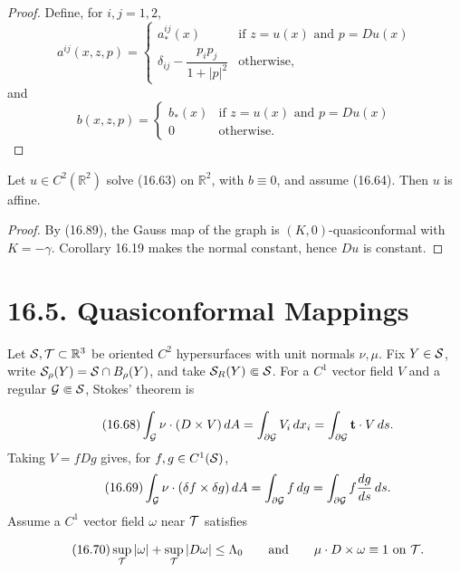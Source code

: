 \begin{proof}
Define, for $i,j=1,2$,
\[
a^{ij}(x,z,p)=\begin{cases}
 a_*^{ij}(x) & \text{if } z=u(x)\text{ and }p=Du(x)\\
 \delta_{ij}-\dfrac{p_ip_j}{1+|p|^2} & \text{otherwise,}
\end{cases}
\]
and
\[
b(x,z,p)=\begin{cases}
 b_*(x) & \text{if } z=u(x)\text{ and }p=Du(x)\\
 0 & \text{otherwise.}
\end{cases}
\]
\end{proof}

\begin{theorem}\label{gilbarg-trudinger.thm.16.12.bernstein}
Let $u\in C^2(\mathbb R^2)$ solve (16.63) on $\mathbb R^2$, with $b\equiv0$, and assume (16.64). Then $u$ is affine.
\end{theorem}
\begin{proof}
\sketch By (16.89), the Gauss map of the graph is $(K,0)$-quasiconformal with $K=-\gamma$. Corollary 16.19 makes the normal constant, hence $Du$ is constant.
\end{proof}



\section*{16.5. Quasiconformal Mappings}

Let $\mathcal{S},\mathcal{T}\subset\mathbb R^3$ be oriented $C^2$ hypersurfaces with
unit normals $\nu,\mu$.  Fix $Y\in\mathcal{S}$, write
$\mathcal{S}_\rho(Y)=\mathcal{S}\cap B_\rho(Y)$, and take
$\mathcal{S}_R(Y)\Subset\mathcal{S}$.  For a $C^1$ vector field $V$ and a regular
$\mathcal{G}\Subset\mathcal{S}$, Stokes' theorem is

\begin{equation}\tag{16.68}
\int_{\mathcal{G}}\nu\cdot(D\times V)\,dA
=\int_{\partial\mathcal{G}}V_i\,dx_i
=\int_{\partial\mathcal{G}}\mathbf t\cdot V\,ds.
\end{equation}
Taking $V=fDg$ gives, for $f,g\in C^1(\mathcal{S})$,
\begin{equation}\tag{16.69}
\int_{\mathcal{G}}\nu\cdot(\delta f\times\delta g)\,dA
=\int_{\partial\mathcal{G}}f\,dg
=\int_{\partial\mathcal{G}}f\frac{dg}{ds}\,ds.
\end{equation}
Assume a $C^1$ vector field $\omega$ near $\mathcal{T}$ satisfies

\begin{equation}\tag{16.70}
\sup_{\mathcal{T}}|\omega|+\sup_{\mathcal{T}}|D\omega|\leq \Lambda_0\qquad \text{and}\qquad \mu\cdot D\times \omega \equiv 1\text{ on }\mathcal{T}.
\end{equation}

